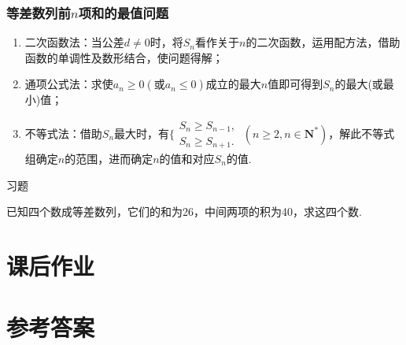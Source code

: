     \subsubsection{等差数列前$ n $项和的最值问题}
      \begin{enumerate}[1)]
        \item 二次函数法：当公差$d\ne0$时，将$ S_n $看作关于$ n $的二次函数，运用配方法，借助函数的单调性及数形结合，使问题得解；
        \item 通项公式法：求使$ a_n\ge0 \left(\text{或}a_n\le0\right)$成立的最大$ n $值即可得到$ S_n $的最大(或最小)值；
        \item 不等式法：借助$ S_n $最大时，有$\Bigg\{\begin{aligned}
      S_n\ge S_{n-1},\\
      S_n\ge S_{n+1}.
      \end{aligned}~(n\ge2,n\in\mathbf{N^*})$，解此不等式组确定$ n $的范围，进而确定$ n $的值和对应$ S_n $的值.
      \end{enumerate}
  \begin{exercise}{\heiti 习题}\\
    \item 已知四个数成等差数列，它们的和为26，中间两项的积为40，求这四个数.
  \end{exercise}


\newpage
\section{课后作业}
  \begin{exercise}
  \end{exercise}
\stopexercise

\newpage
\section{参考答案}
\begin{multicols}{2}
  \printanswer
\end{multicols}
